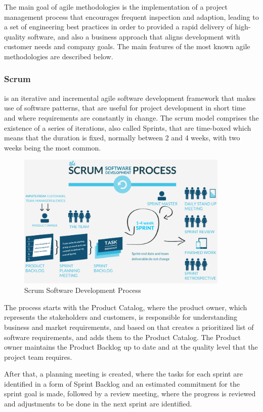 The main goal of agile methodologies is the implementation of a project management process that encourages frequent inspection and adaption, leading to a set of engineering best practices in order to provided a rapid delivery of high-quality software, and also a business approach that aligns development with customer needs and company goals.
The main features of the most known agile methodologies are described below.
\subsubsection{Scrum}

is an iterative and incremental agile software development framework that makes use of software patterns, that are useful for project development in short time and where requirements are constantly in change. The scrum model comprises the existence of a series of iterations, also called Sprints, that are time-boxed which means that the duration is fixed, normally between 2 and 4 weeks, with two weeks being the most common. 

\begin{figure}[h]
    \centering
    \includegraphics[width=0.9\textwidth]{scrumDevelopment}
    \caption{Scrum Software Development Process}
    \label{fig:waterfall}
\end{figure}

The process starts with the Product Catalog, where the product owner, which represents the stakeholders and customers, is responsible for understanding business and market requirements, and based on that creates a prioritized list of software requirements, and adds them to the Product Catalog. The Product owner maintains the Product Backlog up to date and at the quality level that the project team requires.

After that, a planning meeting is created, where the tasks for each sprint are identified in a form of Sprint Backlog and an estimated commitment for the sprint goal is made, followed by a review meeting, where the progress is reviewed and adjustments to be done in the next sprint are identified.

